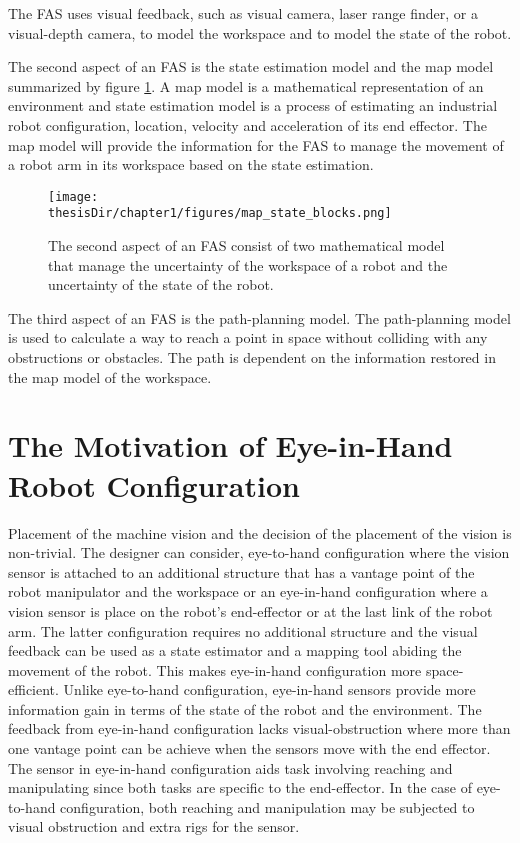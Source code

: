 The FAS uses visual feedback, such as visual camera, laser range finder, or a visual-depth
camera, to model the workspace and to model the state of the robot.

The second aspect of an FAS is the state estimation model and the map model summarized by figure
\ref{fig:map_state_blocks}. A map model is a mathematical representation of an environment and state estimation model is
a process of estimating an industrial robot configuration, location, velocity and acceleration of its end
effector. The map model will provide the information for the FAS to manage the movement of a robot
arm in its workspace based on the state estimation.
\begin{figure}
  \centering
  \texttt{[image: \\thesisDir/chapter1/figures/map\_state\_blocks.png]}
  \caption{The second aspect of an FAS consist of two mathematical model that manage the uncertainty
of the workspace of a robot and the uncertainty of the state of the robot.}
  \label{fig:map_state_blocks}
\end{figure}

The third aspect of an FAS is the path-planning model. 
The path-planning model is used to calculate a
way to reach a point in space without colliding with any obstructions or obstacles. The path is dependent
on the information restored in the map model of the workspace.

\section{The Motivation of Eye-in-Hand Robot Configuration}\label{sec:motive_eyehand}
Placement of the machine vision and the decision of the 
placement of the vision is non-trivial.
The designer can consider, eye-to-hand configuration where the vision sensor is attached to an additional
structure that has a vantage point of the robot manipulator and the workspace \parencite{Luo2016} or an
eye-in-hand configuration where a vision sensor is place on
the robot's end-effector or at the last link of the robot arm.
The latter configuration requires
no additional structure 
and the visual feedback can be used as a state estimator 
and a mapping tool abiding the movement of the robot. This 
makes eye-in-hand configuration more space-efficient. Unlike
eye-to-hand configuration, eye-in-hand sensors provide more
information gain in terms of the state of the robot and the
environment. The feedback from eye-in-hand configuration
lacks visual-obstruction where more than 
one vantage point can be achieve when the sensors move 
with the end effector. The sensor in eye-in-hand configuration
aids task involving reaching and manipulating since both tasks
are specific to the end-effector. In the case of eye-to-hand 
configuration, both reaching and manipulation may be subjected
to visual obstruction and extra rigs for the sensor. 

